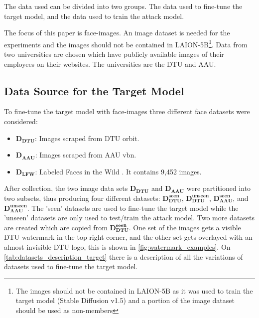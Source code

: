 The data used can be divided into two groups. The data used to fine-tune the target model, and the data used to train the attack model.

The focus of this paper is face-images. An image dataset is needed for the experiments and the images should not be contained in LAION-5B\footnote{The images should not be contained in LAION-5B as it was used to train the target model (Stable Diffusion v1.5) and a portion of the image dataset should be used as non-members}. Data from two universities are chosen which have publicly available images of their employees on their websites. The universities are the \acrfull{DTU} and \acrfull{AAU}.

\subsection{Data Source for the Target Model} \label{sec:data_source_for_target_model}
To fine-tune the target model with face-images three different face datasets were considered:
\begin{itemize}
    \item $\mathbf{D_{DTU}}$: Images scraped from DTU orbit.
    \item $\mathbf{D_{AAU}}$: Images scraped from AAU vbn.
    \item $\mathbf{D_{LFW}}$: Labeled Faces in the Wild \cite{LFWTech}. It contains 9,452 images.
\end{itemize}

After collection, the two image data sets $\mathbf{D_{DTU}}$ and $\mathbf{D_{AAU}}$ were partitioned into two subsets, thus producing four different datasets: $\mathbf{D_{DTU}^{seen}}$, $\mathbf{D_{DTU}^{unseen}}$, $\mathbf{D_{AAU}^{seen}}$, and $\mathbf{D_{AAU}^{unseen}}$. The 'seen' datasets are used to fine-tune the target model while the 'unseen' datasets are only used to test/train the attack model. Two more datasets are created which are copied from $\mathbf{D_{DTU}^{seen}}$. One set of the images gets a visible DTU watermark in the top right corner, and the other set gets overlayed with an almost invisible DTU logo, this is shown in \cref{fig:watermark_examples}. On \cref{tab:datasets_description_target} there is a description of all the variations of datasets used to fine-tune the target model.



